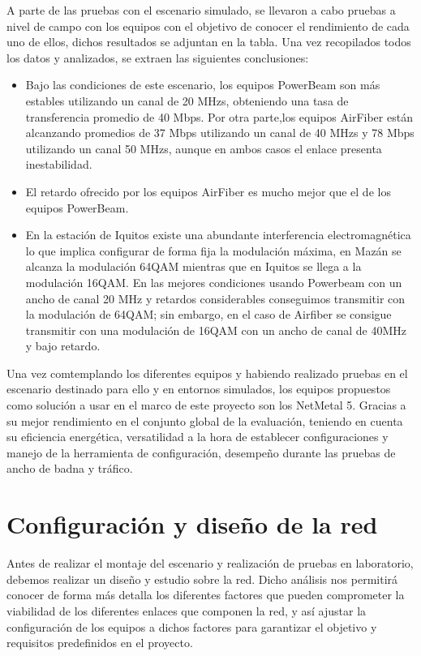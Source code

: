 A parte de las pruebas con el escenario  simulado, se llevaron a cabo pruebas a nivel de campo con los equipos con el objetivo de conocer el rendimiento de cada uno de ellos, dichos resultados se adjuntan en la tabla. Una vez recopilados todos los datos y analizados, se extraen las siguientes conclusiones:

\begin{itemize}
    \item Bajo las condiciones de este escenario, los equipos PowerBeam son más estables utilizando un canal de 20 MHzs, obteniendo una tasa de transferencia promedio de 40 Mbps. Por otra parte,los equipos AirFiber están alcanzando promedios de 37 Mbps utilizando un canal de 40 MHzs y 78 Mbps utilizando un canal 50 MHzs, aunque en ambos casos el enlace presenta inestabilidad.
    \item El retardo ofrecido por los equipos AirFiber es mucho mejor que el de los equipos PowerBeam.
    \item En la estación de Iquitos existe una abundante interferencia electromagnética lo que implica configurar de forma fija la modulación máxima, en Mazán se alcanza la modulación 64QAM mientras que en Iquitos se llega a la modulación 16QAM. En las mejores condiciones usando Powerbeam con un ancho de canal 20 MHz y retardos considerables conseguimos transmitir con la modulación de 64QAM; sin embargo, en el caso de Airfiber se consigue transmitir con una modulación de 16QAM con un ancho de canal de 40MHz y bajo retardo.
\end{itemize}

Una vez comtemplando los diferentes equipos y habiendo realizado pruebas en el escenario destinado para ello y en entornos simulados, los equipos propuestos como solución a usar en el marco de este proyecto son los NetMetal 5. Gracias a su mejor rendimiento en el conjunto global de la evaluación, teniendo en cuenta su eficiencia energética, versatilidad a la hora de establecer configuraciones y manejo de la herramienta de configuración, desempeño durante las pruebas de ancho de badna y tráfico.

\section{Configuración y diseño de la red}
Antes de realizar el montaje del escenario y realización de pruebas en laboratorio, debemos realizar un diseño y estudio sobre la red. Dicho análisis nos permitirá conocer de forma más detalla los diferentes factores que pueden comprometer la viabilidad de los diferentes enlaces que componen la red, y así ajustar la configuración de los equipos a dichos factores para garantizar el objetivo y requisitos predefinidos en el proyecto.\\\\

